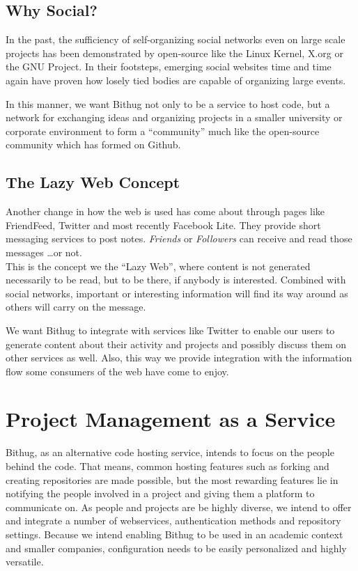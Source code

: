 \documentclass{llncs}
\begin{document}
\subsection{Why Social?}
In the past, the sufficiency of self-organizing social networks even on large 
scale projects has been demonstrated by open-source like the Linux 
Kernel\cite{kernel:www}, X.org\cite{xorg:www} or the GNU Project\cite{gnu:www}.
In their footsteps, emerging social websites time\cite{facebook:help} and 
time\cite{facebook:organize} again\cite{twitter:organize} have proven how losely
tied bodies are capable of organizing large events.

In this manner, we want Bithug not only to be a service to host code, but a 
network for exchanging ideas and organizing projects in a smaller university 
or corporate environment to form a ``community'' much like the open-source 
community which has formed on Github.
\subsection{The Lazy Web Concept}
Another change in how the web is used has come about through pages like 
FriendFeed, Twitter and most recently Facebook Lite. They provide short 
messaging services to post notes. \emph{Friends} or \emph{Followers} can
receive and read those messages \ldots or not. \\
This is the concept we the ``Lazy Web'', where content is not generated 
necessarily to be read, but to be there, if anybody is interested. Combined 
with social networks, important or interesting information will find its way 
around as others will carry on the message.

We want Bithug to integrate with services like Twitter to enable our users to
generate content about their activity and projects and possibly discuss them on
other services as well. Also, this way we provide integration with the 
information flow some consumers of the web have come to enjoy.
\section{Project Management as a Service}
Bithug, as an alternative code hosting service, intends to focus on the people 
behind the code. That means, common hosting features such as forking and creating 
repositories are made possible, but the most rewarding features lie in notifying 
the people involved in a project and giving them a platform to communicate on. As 
people and projects are be highly diverse, we intend to offer and integrate a 
number of webservices, authentication methods and repository settings. Because 
we intend enabling Bithug to be used in an academic context and smaller companies, 
configuration needs to be easily personalized and highly versatile.
\end{document}
